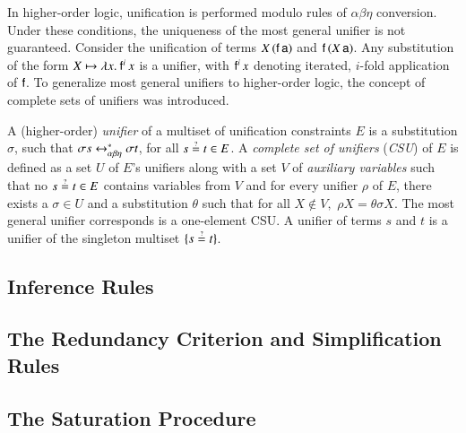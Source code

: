 In higher-order logic, unification is performed modulo rules of
$\alpha\beta\eta$ conversion. Under these conditions, the uniqueness of the most
general unifier is not guaranteed. Consider the unification of terms $X \,
(\mathsf{f} \, \mathsf{a})$ and $\mathsf{f} \, (X \, \mathsf{a})$. Any substitution of the
form $X \mapsto \lambda x.\> \mathsf{f}^i \, x$ is a unifier, with $\mathsf{f}^i \, x$
denoting iterated, $i$-fold application of $\mathsf{f}$. To generalize most general unifiers
to higher-order logic, the concept of complete sets of unifiers was introduced.

A (higher-order) \emph{unifier} of a multiset of unification constraints $E$ is
a substitution $\sigma$, such that $\sigma s \leftrightarrow^*_{\alpha\beta\eta} \sigma t$, for all $s \unif t
\in E$. A \emph{complete set of unifiers} (\emph{CSU}) of $E$ is defined as a
set $U$ of $E$'s unifiers along with a set $V$ of \emph{auxiliary variables}
such that no $s \unif t \in E$ contains variables from $V$ and for every unifier
$\rho$ of $E$, there exists a $\sigma \in U$ and a substitution $\theta$ such
that for all $X\not\in V,$ $\rho X = \theta\sigma X$. The most general
unifier corresponds is a one-element CSU. A unifier of terms $s$ and $t$ is a
unifier of the singleton multiset $\{ s \unif t \}$.




\subsection{Inference Rules}
\subsection{The Redundancy Criterion and Simplification Rules}
\subsection{The Saturation Procedure}
